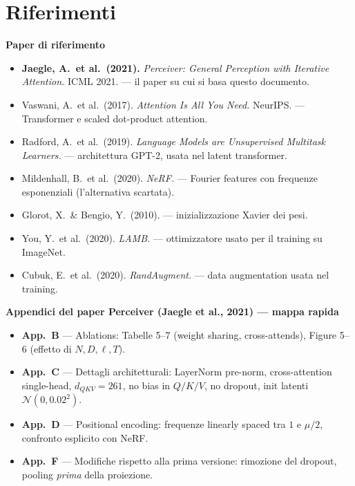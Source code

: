 \documentclass[11pt]{article}
\newcommand{\curstage}{0}
\newcommand{\stage}[1]{\gdef\curstage{#1}}
\begin{document}
\section*{Riferimenti}
\stage{0}

\begin{notabox}
\textbf{Paper di riferimento}
\begin{itemize}\setlength\itemsep{0.15em}
\item \textbf{Jaegle, A.\ et al.\ (2021).} \emph{Perceiver: General Perception with Iterative Attention.} ICML 2021. --- il paper su cui si basa questo documento.
\item Vaswani, A.\ et al.\ (2017). \emph{Attention Is All You Need.} NeurIPS. --- Transformer e scaled dot-product attention.
\item Radford, A.\ et al.\ (2019). \emph{Language Models are Unsupervised Multitask Learners.} --- architettura GPT-2, usata nel latent transformer.
\item Mildenhall, B.\ et al.\ (2020). \emph{NeRF.} --- Fourier features con frequenze esponenziali (l'alternativa scartata).
\item Glorot, X.\ \& Bengio, Y.\ (2010). --- inizializzazione Xavier dei pesi.
\item You, Y.\ et al.\ (2020). \emph{LAMB.} --- ottimizzatore usato per il training su ImageNet.
\item Cubuk, E.\ et al.\ (2020). \emph{RandAugment.} --- data augmentation usata nel training.
\end{itemize}

\medskip
\textbf{Appendici del paper Perceiver (Jaegle et al., 2021) --- mappa rapida}
\begin{itemize}\setlength\itemsep{0.15em}
\item \textbf{App.\ B} --- Ablations: Tabelle 5--7 (weight sharing, cross-attends), Figure 5--6 (effetto di $N, D, \ell, T$).
\item \textbf{App.\ C} --- Dettagli architetturali: LayerNorm pre-norm, cross-attention single-head, $d_{QKV}=261$, no bias in $Q/K/V$, no dropout, init latenti $\mathcal{N}(0, 0.02^2)$.
\item \textbf{App.\ D} --- Positional encoding: frequenze linearly spaced tra $1$ e $\mu/2$, confronto esplicito con NeRF.
\item \textbf{App.\ F} --- Modifiche rispetto alla prima versione: rimozione del dropout, pooling \emph{prima} della proiezione.
\end{itemize}
\end{notabox}
\end{document}
